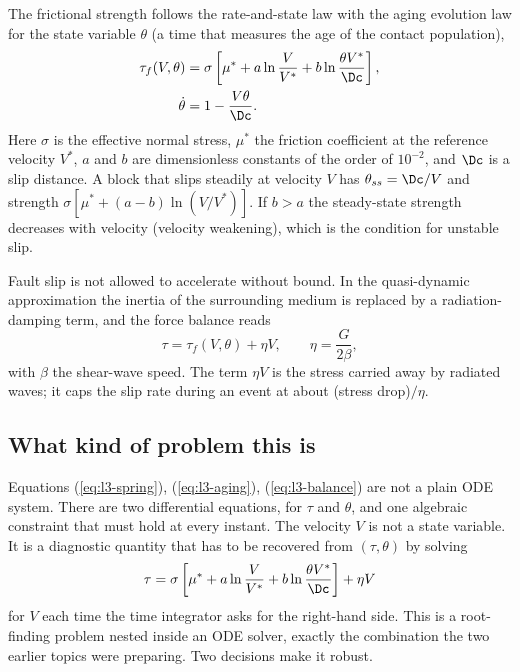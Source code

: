 The frictional strength follows the rate-and-state law with the aging evolution law for the state variable $\theta$ (a time that measures the age of the contact population),
\begin{align}
\tau_f(V,\theta) &= \sigma\left[\mu^* + a\ln\frac{V}{V^*} + b\ln\frac{\theta V^*}{\Dc}\right],
\label{eq:l3-rsf}\\
\dot\theta &= 1 - \frac{V\theta}{\Dc}.
\label{eq:l3-aging}
\end{align}
Here $\sigma$ is the effective normal stress, $\mu^*$ the friction coefficient at the reference velocity $V^*$, $a$ and $b$ are dimensionless constants of the order of $10^{-2}$, and $\Dc$ is a slip distance. A block that slips steadily at velocity $V$ has $\theta_{ss}=\Dc/V$ and strength $\sigma[\mu^*+(a-b)\ln(V/V^*)]$. If $b>a$ the steady-state strength decreases with velocity (velocity weakening), which is the condition for unstable slip.

Fault slip is not allowed to accelerate without bound. In the quasi-dynamic approximation the inertia of the surrounding medium is replaced by a radiation-damping term, and the force balance reads
\begin{equation}
\tau = \tau_f(V,\theta) + \eta V,\qquad \eta = \frac{G}{2\beta},
\label{eq:l3-balance}
\end{equation}
with $\beta$ the shear-wave speed. The term $\eta V$ is the stress carried away by radiated waves; it caps the slip rate during an event at about (stress drop)$/\eta$.

\subsection{What kind of problem this is}

Equations (\ref{eq:l3-spring}), (\ref{eq:l3-aging}), (\ref{eq:l3-balance}) are not a plain ODE system. There are two differential equations, for $\tau$ and $\theta$, and one algebraic constraint that must hold at every instant. The velocity $V$ is not a state variable. It is a diagnostic quantity that has to be recovered from $(\tau,\theta)$ by solving
\begin{equation}
\tau = \sigma\left[\mu^*+a\ln\frac{V}{V^*}+b\ln\frac{\theta V^*}{\Dc}\right]+\eta V
\label{eq:l3-constraint}
\end{equation}
for $V$ each time the time integrator asks for the right-hand side. This is a root-finding problem nested inside an ODE solver, exactly the combination the two earlier topics were preparing. Two decisions make it robust.

